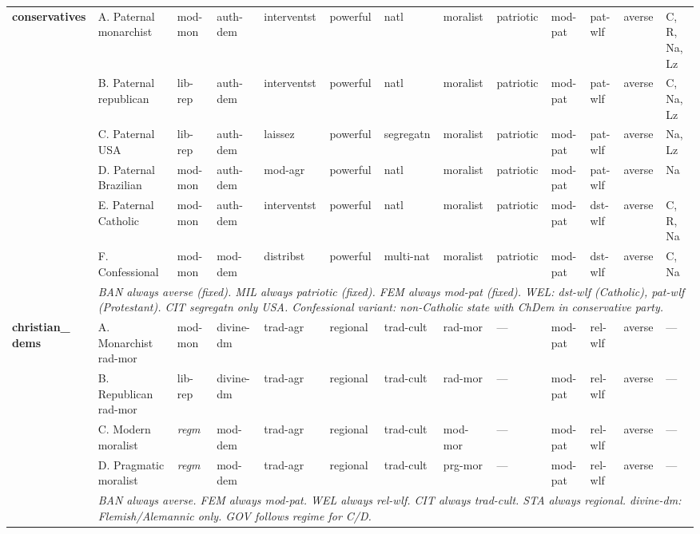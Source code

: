 \documentclass[a4paper]{article}
\newcommand{\nd}{---}
\newcommand{\reg}{\textit{regm}}
\newcommand{\minorrow}[2]{\rowcolor{minorRow} #1 & \multicolumn{12}{p{22cm}|}{\textit{#2}} \\}
\begin{document}
\begin{footnotesize}
\begin{longtable}{|p{1.8cm}|p{2.3cm}|p{1.55cm}|p{1.65cm}|p{1.65cm}|p{1.3cm}|p{1.5cm}|p{1.5cm}|p{1.5cm}|p{1.3cm}|p{1.45cm}|p{1.0cm}|p{2.65cm}|}
\multirow{7}{*}{\cellcolor{rightHdr}\textbf{conserva\-tives}} &
  A. Paternal monarchist & mod-mon & auth-dem & interventst & powerful & natl & moralist & patriotic & mod-pat & pat-wlf & averse & C, R, Na, Lz \\ \cline{2-13}
\cellcolor{rightHdr} &
  B. Paternal republican & lib-rep & auth-dem & interventst & powerful & natl & moralist & patriotic & mod-pat & pat-wlf & averse & C, Na, Lz \\ \cline{2-13}
\cellcolor{rightHdr} &
  C. Paternal USA & lib-rep & auth-dem & laissez & powerful & segregatn & moralist & patriotic & mod-pat & pat-wlf & averse & Na, Lz \\ \cline{2-13}
\cellcolor{rightHdr} &
  D. Paternal Brazilian & mod-mon & auth-dem & mod-agr & powerful & natl & moralist & patriotic & mod-pat & pat-wlf & averse & Na \\ \cline{2-13}
\cellcolor{rightHdr} &
  E. Paternal Catholic & mod-mon & auth-dem & interventst & powerful & natl & moralist & patriotic & mod-pat & dst-wlf & averse & C, R, Na \\ \cline{2-13}
\cellcolor{rightHdr} &
  F. Confessional & mod-mon & mod-dem & distribst & powerful & multi-nat & moralist & patriotic & mod-pat & dst-wlf & averse & C, Na \\ \cline{2-13}
\minorrow{\cellcolor{rightHdr}}{BAN always averse (fixed). MIL always patriotic (fixed). FEM always mod-pat (fixed). WEL: dst-wlf (Catholic), pat-wlf (Protestant). CIT segregatn only USA. Confessional variant: non-Catholic state with ChDem in conservative party.}
\hline

\multirow{5}{*}{\cellcolor{rightHdr}\textbf{christian\_ dems}} &
  A. Monarchist rad-mor & mod-mon & divine-dm & trad-agr & regional & trad-cult & rad-mor & \nd & mod-pat & rel-wlf & averse & \nd \\ \cline{2-13}
\cellcolor{rightHdr} &
  B. Republican rad-mor & lib-rep & divine-dm & trad-agr & regional & trad-cult & rad-mor & \nd & mod-pat & rel-wlf & averse & \nd \\ \cline{2-13}
\cellcolor{rightHdr} &
  C. Modern moralist & \reg & mod-dem & trad-agr & regional & trad-cult & mod-mor & \nd & mod-pat & rel-wlf & averse & \nd \\ \cline{2-13}
\cellcolor{rightHdr} &
  D. Pragmatic moralist & \reg & mod-dem & trad-agr & regional & trad-cult & prg-mor & \nd & mod-pat & rel-wlf & averse & \nd \\ \cline{2-13}
\minorrow{\cellcolor{rightHdr}}{BAN always averse. FEM always mod-pat. WEL always rel-wlf. CIT always trad-cult. STA always regional. divine-dm: Flemish/Alemannic only. GOV follows regime for C/D.}
\hline


\end{longtable}
\end{footnotesize}
\end{document}
